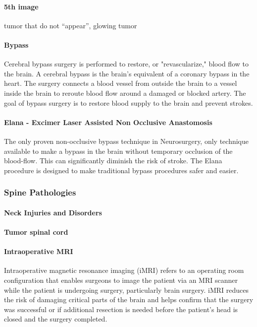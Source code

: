 \documentclass[12pt,article,oneside,a4paper]{memoir}
\begin{document}
\paragraph{5th image} tumor that do not ``appear'', glowing tumor
 
\paragraph{Bypass} Cerebral bypass surgery is performed to restore, or "revascularize," blood flow to the brain. A cerebral bypass is the brain's equivalent of a coronary bypass in the heart. The surgery connects a blood vessel from outside the brain to a vessel inside the brain to reroute blood flow around a damaged or blocked artery. The goal of bypass surgery is to restore blood supply to the brain and prevent strokes.

\paragraph{Elana - Excimer Laser Assisted Non Occlusive Anastomosis} The only proven non-occlusive bypass technique in Neurosurgery,  only technique available to make a bypass in the brain without temporary occlusion of the blood-flow. This can significantly diminish the risk of stroke. The Elana procedure is designed to make traditional bypass procedures safer and easier.

\subsubsection{Spine Pathologies}
\paragraph{Neck Injuries and Disorders}
\paragraph{Tumor spinal cord} 

\paragraph{Intraoperative MRI} Intraoperative magnetic resonance imaging (iMRI) refers to an operating room configuration that enables surgeons to image the patient via an MRI scanner while the patient is undergoing surgery, particularly brain surgery. iMRI reduces the risk of damaging critical parts of the brain and helps confirm that the surgery was successful or if additional resection is needed before the patient’s head is closed and the surgery completed.
\end{document}
